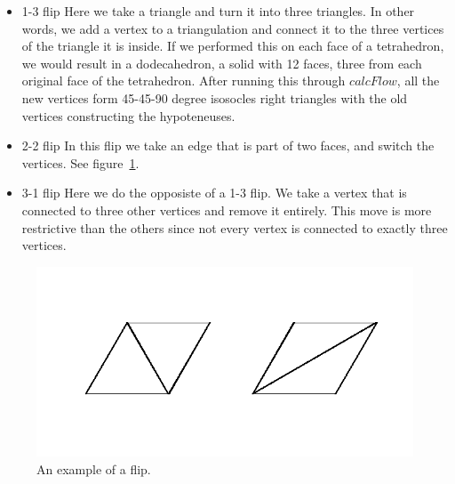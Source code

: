 \documentclass[12pt]{article}
\begin{document}
\begin{itemize}
\item 1-3 flip \newline
Here we take a triangle and turn it into three triangles. In other words, we add a vertex to a triangulation and connect it to the three vertices of the triangle it is inside. If we performed this on each face of a tetrahedron, we would result in a dodecahedron, a solid with 12 faces, three from each original face of the tetrahedron. After running this through $calcFlow$, all the new vertices form 45-45-90 degree isosocles right triangles with the old vertices constructing the hypoteneuses. 
\item 2-2 flip \newline
In this flip we take an edge that is part of two faces, and switch the vertices. See figure~\ref{fig:flip}. 
\item 3-1 flip \newline
Here we do the opposiste of a 1-3 flip. We take a vertex that is connected to three other vertices and remove it entirely. This move is more restrictive than the others since not every vertex is connected to exactly three vertices. 
\end{itemize}
\begin{figure}
\centering
\includegraphics[scale = 1.0]{Flip.png}
\caption{An example of a flip.}
\label{fig:flip}
\end{figure}
  
\end{document}
